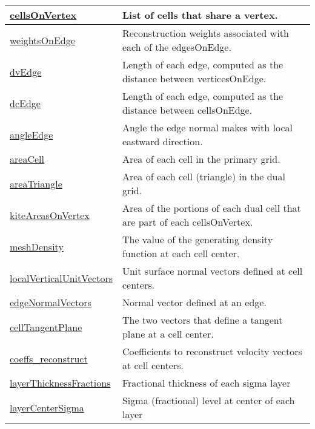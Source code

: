 {\begin{center}
\begin{longtable}{| p{2.0in} | p{4.0in} |}
    \hline
    \hyperref[subsec:var_sec_mesh_cellsOnVertex]{cellsOnVertex} & List of cells that share a vertex. \\
    \hline
    \hyperref[subsec:var_sec_mesh_weightsOnEdge]{weightsOnEdge} & Reconstruction weights associated with each of the edgesOnEdge. \\
    \hline
    \hyperref[subsec:var_sec_mesh_dvEdge]{dvEdge} & Length of each edge, computed as the distance between verticesOnEdge. \\
    \hline
    \hyperref[subsec:var_sec_mesh_dcEdge]{dcEdge} & Length of each edge, computed as the distance between cellsOnEdge. \\
    \hline
    \hyperref[subsec:var_sec_mesh_angleEdge]{angleEdge} & Angle the edge normal makes with local eastward direction. \\
    \hline
    \hyperref[subsec:var_sec_mesh_areaCell]{areaCell} & Area of each cell in the primary grid. \\
    \hline
    \hyperref[subsec:var_sec_mesh_areaTriangle]{areaTriangle} & Area of each cell (triangle) in the dual grid. \\
    \hline
    \hyperref[subsec:var_sec_mesh_kiteAreasOnVertex]{kiteAreasOnVertex} & Area of the portions of each dual cell that are part of each cellsOnVertex. \\
    \hline
    \hyperref[subsec:var_sec_mesh_meshDensity]{meshDensity} & The value of the generating density function at each cell center. \\
    \hline
    \hyperref[subsec:var_sec_mesh_localVerticalUnitVectors]{localVerticalUnitVectors} & Unit surface normal vectors defined at cell centers. \\
    \hline
    \hyperref[subsec:var_sec_mesh_edgeNormalVectors]{edgeNormalVectors} & Normal vector defined at an edge. \\
    \hline
    \hyperref[subsec:var_sec_mesh_cellTangentPlane]{cellTangentPlane} & The two vectors that define a tangent plane at a cell center. \\
    \hline
    \hyperref[subsec:var_sec_mesh_coeffs_reconstruct]{coeffs\_reconstruct} & Coefficients to reconstruct velocity vectors at cell centers. \\
    \hline
    \hyperref[subsec:var_sec_mesh_layerThicknessFractions]{layerThicknessFractions} & Fractional thickness of each sigma layer \\
    \hline
    \hyperref[subsec:var_sec_mesh_layerCenterSigma]{layerCenterSigma} & Sigma (fractional) level at center of each layer \\

\end{longtable}
\end{center}}
